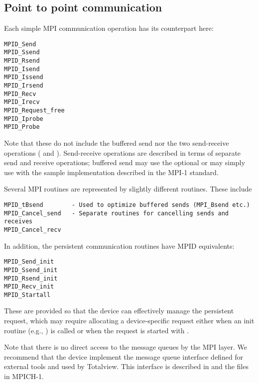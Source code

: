 \subsection{Point to point communication}
Each simple MPI communication operation has its counterpart here:
\begin{verbatim}
MPID_Send
MPID_Ssend
MPID_Rsend
MPID_Isend
MPID_Issend
MPID_Irsend
MPID_Recv
MPID_Irecv
MPID_Request_free
MPID_Iprobe
MPID_Probe
\end{verbatim}
Note that these do not include the buffered send nor the two send-receive
operations ( and ).
Send-receive operations are described in terms of separate send and receive
operations; buffered send may use the optional  or may
simply use  with the sample implementation described in the
MPI-1 standard.

Several MPI routines are represented by slightly different routines.
These include 
\begin{verbatim}
MPID_tBsend        - Used to optimize buffered sends (MPI_Bsend etc.)
MPID_Cancel_send   - Separate routines for cancelling sends and receives
MPID_Cancel_recv
\end{verbatim}

In addition, the persistent communication routines have MPID equivalents:
\begin{verbatim}
MPID_Send_init
MPID_Ssend_init
MPID_Rsend_init
MPID_Recv_init
MPID_Startall
\end{verbatim}
These are provided so that the device can effectively manage the
persistent request, which may require allocating a device-specific
request either when an init routine (e.g., ) is
called or when the request is started with .  

Note that there is no direct access to the message queues by the MPI
layer.  We recommend that the device implement the message queue
interface defined for external tools and used by Totalview.  This
interface is described in \cite{pvmmpi99-totalview} and the files
 in MPICH-1.

